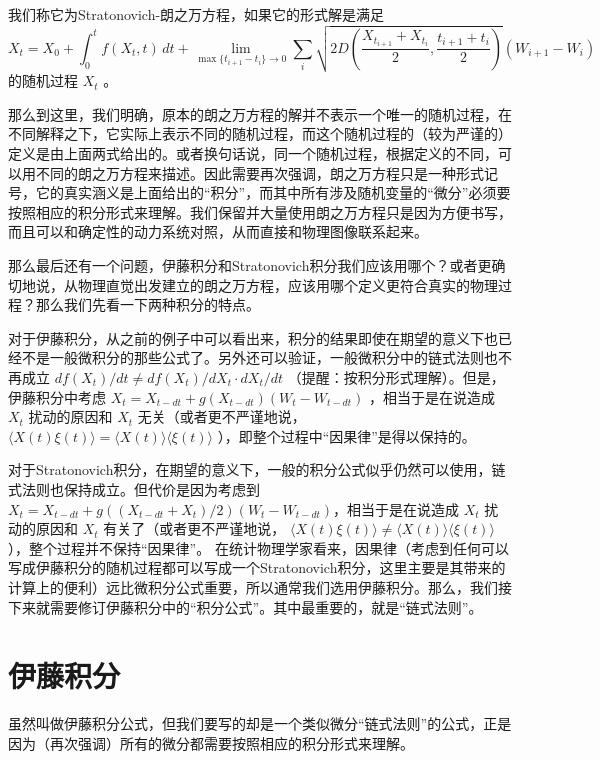 \documentclass{ctexart}
\begin{document}
我们称它为Stratonovich-朗之万方程，如果它的形式解是满足
\begin{equation}
X_t=X_0+\int_0^t f(X_t,t)\, dt+\lim_{\max\{t_{i+1}-t_i\}\to 0}\sum_i\sqrt{2D\left(\frac{X_{t_{i+1}}+X_{t_i}}{2},\frac{t_{i+1}+t_i}{2}\right)}(W_{i+1}-W_i)
\end{equation}
的随机过程 $X_t$ 。

那么到这里，我们明确，原本的朗之万方程的解并不表示一个唯一的随机过程，在不同解释之下，它实际上表示不同的随机过程，而这个随机过程的（较为严谨的）定义是由上面两式给出的。或者换句话说，同一个随机过程，根据定义的不同，可以用不同的朗之万方程来描述。因此需要再次强调，朗之万方程只是一种形式记号，它的真实涵义是上面给出的“积分”，而其中所有涉及随机变量的“微分”必须要按照相应的积分形式来理解。我们保留并大量使用朗之万方程只是因为方便书写，而且可以和确定性的动力系统对照，从而直接和物理图像联系起来。

那么最后还有一个问题，伊藤积分和Stratonovich积分我们应该用哪个？或者更确切地说，从物理直觉出发建立的朗之万方程，应该用哪个定义更符合真实的物理过程？那么我们先看一下两种积分的特点。

对于伊藤积分，从之前的例子中可以看出来，积分的结果即使在期望的意义下也已经不是一般微积分的那些公式了。另外还可以验证，一般微积分中的链式法则也不再成立 $df(X_t)/dt\neq df(X_t)/dX_t\cdot dX_t/dt$ （提醒：按积分形式理解）。但是，伊藤积分中考虑 $X_t=X_{t-dt}+g(X_{t-dt})(W_{t}-W_{t-dt})$ ，相当于是在说造成 $X_t$ 扰动的原因和 $X_t$ 无关（或者更不严谨地说， $\langle X(t)\xi(t)\rangle=\langle X(t)\rangle\langle\xi(t)\rangle$ ），即整个过程中“因果律”是得以保持的。

对于Stratonovich积分，在期望的意义下，一般的积分公式似乎仍然可以使用，链式法则也保持成立。但代价是因为考虑到$X_t=X_{t-dt}+g((X_{t-dt}+X_{t})/2)(W_{t}-W_{t-dt})$，相当于是在说造成 $X_t$ 扰动的原因和 $X_t$ 有关了（或者更不严谨地说， $\langle X(t)\xi(t)\rangle\neq\langle X(t)\rangle\langle\xi(t)\rangle$ ），整个过程并不保持“因果律”。
在统计物理学家看来，因果律（考虑到任何可以写成伊藤积分的随机过程都可以写成一个Stratonovich积分，这里主要是其带来的计算上的便利）远比微积分公式重要，所以通常我们选用伊藤积分。那么，我们接下来就需要修订伊藤积分中的“积分公式”。其中最重要的，就是“链式法则”。

\section{伊藤积分}
虽然叫做伊藤积分公式，但我们要写的却是一个类似微分“链式法则”的公式，正是因为（再次强调）所有的微分都需要按照相应的积分形式来理解。
\end{document}
